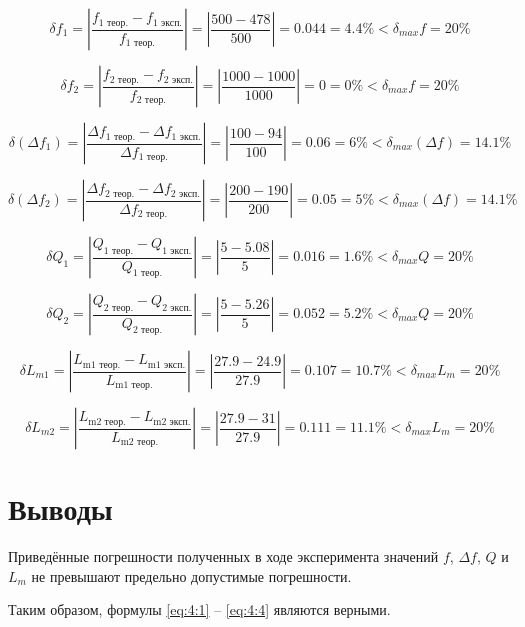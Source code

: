 \begin{displaymath}
	\delta f_1 = \left|\frac{f_\text{1 теор.} - f_\text{1 эксп.}}{f_\text{1 теор.}} \right| = \left|\frac{500 - 478}{500}\right| = 0.044 = 4.4\% < \delta_{max} f = 20\%
\end{displaymath}

\begin{displaymath}
	\delta f_2 = \left|\frac{f_\text{2 теор.} - f_\text{2 эксп.}}{f_\text{2 теор.}} \right| = \left|\frac{1000 - 1000}{1000}\right| = 0 = 0\% < \delta_{max} f = 20\%
\end{displaymath}

\begin{displaymath}
	\delta (\Delta f_1) = \left|\frac{\Delta f_\text{1 теор.} - \Delta f_\text{1 эксп.}}{\Delta f_\text{1 теор.}} \right| = \left|\frac{100 - 94}{100}\right| = 0.06 = 6\% < \delta_{max} (\Delta f) = 14.1\%
\end{displaymath}

\begin{displaymath}
	\delta (\Delta f_2) = \left|\frac{\Delta f_\text{2 теор.} - \Delta f_\text{2 эксп.}}{\Delta f_\text{2 теор.}} \right| = \left|\frac{200 - 190}{200}\right| = 0.05 = 5\% < \delta_{max} (\Delta f) = 14.1\%
\end{displaymath}

\begin{displaymath}
	\delta Q_1 = \left|\frac{Q_\text{1 теор.} - Q_\text{1 эксп.}}{Q_\text{1 теор.}} \right| = \left|\frac{5 - 5.08}{5}\right| = 0.016 = 1.6\% < \delta_{max} Q = 20\%
\end{displaymath}

\begin{displaymath}
	\delta Q_2 = \left|\frac{Q_\text{2 теор.} - Q_\text{2 эксп.}}{Q_\text{2 теор.}} \right| = \left|\frac{5 - 5.26}{5}\right| = 0.052 = 5.2\% < \delta_{max} Q = 20\%
\end{displaymath}

\begin{displaymath}
	\delta L_{m1} = \left|\frac{L_\text{m1 теор.} - L_\text{m1 эксп.}}{L_\text{m1 теор.}} \right| = \left|\frac{27.9 - 24.9}{27.9}\right| = 0.107 = 10.7\% < \delta_{max} L_m = 20\%
\end{displaymath}

\begin{displaymath}
	\delta L_{m2} = \left|\frac{L_\text{m2 теор.} - L_\text{m2 эксп.}}{L_\text{m2 теор.}} \right| = \left|\frac{27.9 - 31}{27.9}\right| = 0.111 = 11.1\% < \delta_{max} L_m = 20\%
\end{displaymath}

\section{Выводы}

Приведённые погрешности полученных в ходе эксперимента значений $f$, $\Delta f$, $Q$ и $L_m$ не превышают предельно допустимые погрешности.

Таким образом, формулы \ref{eq:4:1} -- \ref{eq:4:4} являются верными.

